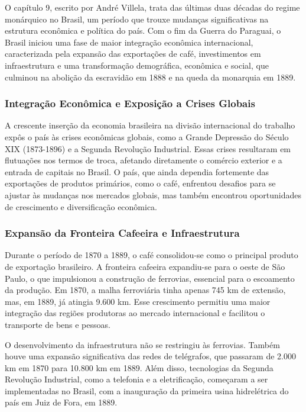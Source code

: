 \documentclass[a4paper,12pt]{article}[abntex2]
\begin{document}
O capítulo 9, escrito por André Villela, trata das últimas duas décadas do regime monárquico no Brasil, um período que trouxe mudanças significativas na estrutura econômica e política do país. Com o fim da Guerra do Paraguai, o Brasil iniciou uma fase de maior integração econômica internacional, caracterizada pela expansão das exportações de café, investimentos em infraestrutura e uma transformação demográfica, econômica e social, que culminou na abolição da escravidão em 1888 e na queda da monarquia em 1889.

\subsubsection*{Integração Econômica e Exposição a Crises Globais}

A crescente inserção da economia brasileira na divisão internacional do trabalho expôs o país às crises econômicas globais, como a Grande Depressão do Século XIX (1873-1896) e a Segunda Revolução Industrial. Essas crises resultaram em flutuações nos termos de troca, afetando diretamente o comércio exterior e a entrada de capitais no Brasil. O país, que ainda dependia fortemente das exportações de produtos primários, como o café, enfrentou desafios para se ajustar às mudanças nos mercados globais, mas também encontrou oportunidades de crescimento e diversificação econômica.

\subsubsection*{Expansão da Fronteira Cafeeira e Infraestrutura}

Durante o período de 1870 a 1889, o café consolidou-se como o principal produto de exportação brasileiro. A fronteira cafeeira expandiu-se para o oeste de São Paulo, o que impulsionou a construção de ferrovias, essencial para o escoamento da produção. Em 1870, a malha ferroviária tinha apenas 745 km de extensão, mas, em 1889, já atingia 9.600 km. Esse crescimento permitiu uma maior integração das regiões produtoras ao mercado internacional e facilitou o transporte de bens e pessoas.

O desenvolvimento da infraestrutura não se restringiu às ferrovias. Também houve uma expansão significativa das redes de telégrafos, que passaram de 2.000 km em 1870 para 10.800 km em 1889. Além disso, tecnologias da Segunda Revolução Industrial, como a telefonia e a eletrificação, começaram a ser implementadas no Brasil, com a inauguração da primeira usina hidrelétrica do país em Juiz de Fora, em 1889.
\end{document}
